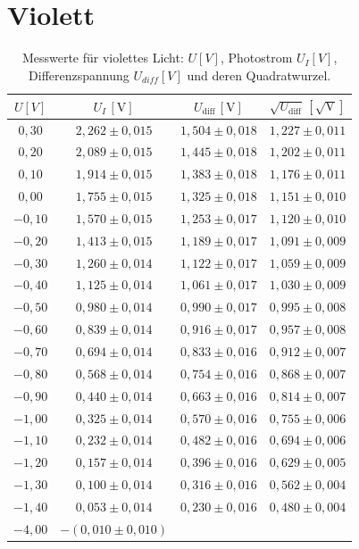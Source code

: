 \section{Violett}
\begin{table}[h!]
    \centering
    \begin{tabular}{cccc}
    \hline
    $U [V]$ & $U_I \, [\mathrm{V}]$ & $U_{\text{diff}} \, [\mathrm{V}]$ & $\sqrt{U_{\text{diff}}} \, [\mathrm{\sqrt{V}}]$ \\
    \hline
    $0,30$ & $2,262 \pm 0,015$ & $1,504 \pm 0,018$ & $1,227 \pm 0,011$ \\
    $0,20$ & $2,089 \pm 0,015$ & $1,445 \pm 0,018$ & $1,202 \pm 0,011$ \\
    $0,10$ & $1,914 \pm 0,015$ & $1,383 \pm 0,018$ & $1,176 \pm 0,011$ \\
    $0,00$ & $1,755 \pm 0,015$ & $1,325 \pm 0,018$ & $1,151 \pm 0,010$ \\
    $-0,10$ & $1,570 \pm 0,015$ & $1,253 \pm 0,017$ & $1,120 \pm 0,010$ \\
    $-0,20$ & $1,413 \pm 0,015$ & $1,189 \pm 0,017$ & $1,091 \pm 0,009$ \\
    $-0,30$ & $1,260 \pm 0,014$ & $1,122 \pm 0,017$ & $1,059 \pm 0,009$ \\
    $-0,40$ & $1,125 \pm 0,014$ & $1,061 \pm 0,017$ & $1,030 \pm 0,009$ \\
    $-0,50$ & $0,980 \pm 0,014$ & $0,990 \pm 0,017$ & $0,995 \pm 0,008$ \\
    $-0,60$ & $0,839 \pm 0,014$ & $0,916 \pm 0,017$ & $0,957 \pm 0,008$ \\
    $-0,70$ & $0,694 \pm 0,014$ & $0,833 \pm 0,016$ & $0,912 \pm 0,007$ \\
    $-0,80$ & $0,568 \pm 0,014$ & $0,754 \pm 0,016$ & $0,868 \pm 0,007$ \\
    $-0,90$ & $0,440 \pm 0,014$ & $0,663 \pm 0,016$ & $0,814 \pm 0,007$ \\
    $-1,00$ & $0,325 \pm 0,014$ & $0,570 \pm 0,016$ & $0,755 \pm 0,006$ \\
    $-1,10$ & $0,232 \pm 0,014$ & $0,482 \pm 0,016$ & $0,694 \pm 0,006$ \\
    $-1,20$ & $0,157 \pm 0,014$ & $0,396 \pm 0,016$ & $0,629 \pm 0,005$ \\
    $-1,30$ & $0,100 \pm 0,014$ & $0,316 \pm 0,016$ & $0,562 \pm 0,004$ \\
    $-1,40$ & $0,053 \pm 0,014$ & $0,230 \pm 0,016$ & $0,480 \pm 0,004$ \\
    $-4,00$ & $-(0,010 \pm 0,010)$ & & \\
    \hline
    \end{tabular}
    \caption{Messwerte für violettes Licht: $U [V]$, Photostrom $U_I [V]$, Differenzspannung $U_{diff} [V]$ und deren Quadratwurzel.}
    \label{tab:violett_values}
\end{table}



